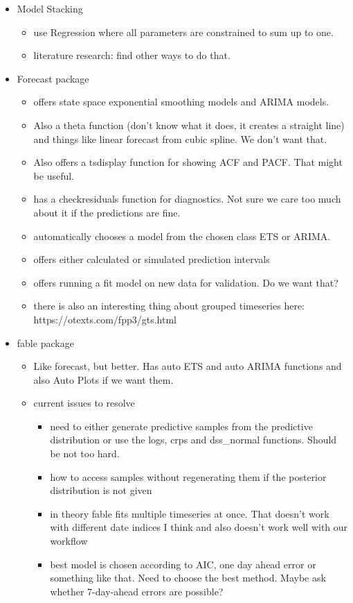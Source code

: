 \begin{itemize}
\item Model Stacking
	\begin{itemize}
	\item use Regression where all parameters are constrained to sum up to one. 
	\item literature research: find other ways to do that. 
	\end{itemize}

\item Forecast package
	\begin{itemize}
	\item offers state space exponential smoothing models and ARIMA models. 
	\item Also a theta function (don't know what it does, it creates a straight line) and things like linear forecast from cubic spline. We don't want that. 
	\item Also offers a tsdisplay function for showing ACF and PACF. That might be useful. 
	\item has a checkresiduals function for diagnostics. Not sure we care too much about it if the predictions are fine. 
	\item automatically chooses a model from the chosen class ETS or ARIMA. 
	\item offers either calculated or simulated prediction intervals
	\item offers running a fit model on new data for validation. Do we want that? 
	\item there is also an interesting thing about grouped timeseries here: https://otexts.com/fpp3/gts.html
	\end{itemize}
\item fable package
	\begin{itemize}
	\item Like forecast, but better. Has auto ETS and auto ARIMA functions and also Auto Plots if we want them. 
	\item current issues to resolve
		\begin{itemize}
		\item need to either generate predictive samples from the predictive distribution or use the logs, crps and dss_normal functions. Should be not too hard. 
		\item how to access samples without regenerating them if the posterior distribution is not given
		\item in theory fable fits multiple timeseries at once. That doesn't work with different date indices I think and also doesn't work well with our workflow
		\item best model is chosen according to AIC, one day ahead error or something like that. Need to choose the best method. Maybe ask whether 7-day-ahead errors are possible?
		\end{itemize}
	\end{itemize}


\end{itemize}
